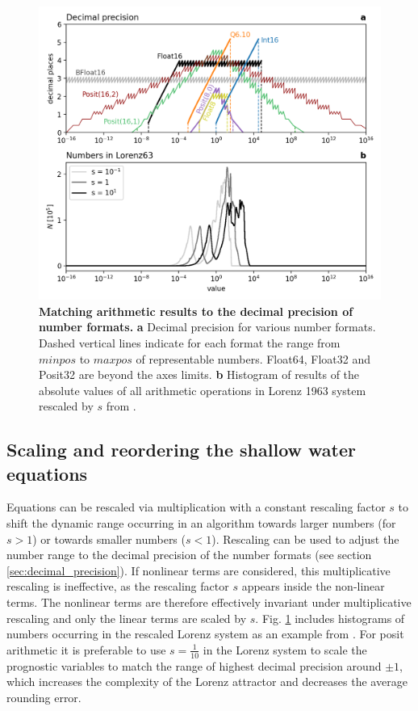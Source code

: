 \begin{figure}[htbp]
\includegraphics[width=1\textwidth]{Figures/swm/decimal_precision.png}
\caption{\textbf{Matching arithmetic results to the decimal precision of number formats.}
\textbf{a} Decimal precision for various number formats. Dashed vertical lines indicate for each format the range from $minpos$ to
$maxpos$ of representable numbers. Float64, Float32 and Posit32 are beyond the axes limits. \textbf{b} Histogram of results
of the absolute values of all arithmetic operations in Lorenz 1963 system rescaled by $s$ from \citep{Klower2019a}.}
\label{fig:swm_dec_prec}
\end{figure}

\subsection{Scaling and reordering the shallow water equations}
\label{sec:swm_scale}

Equations can be rescaled via multiplication with a constant rescaling factor $s$ to shift the dynamic range occurring in an algorithm
towards larger numbers (for $s > 1$) or towards smaller numbers ($s < 1$). Rescaling can be used to adjust the number range to the
decimal precision of the number formats (see section \ref{sec:decimal_precision}). If nonlinear terms are considered, this multiplicative
rescaling is ineffective, as the rescaling factor $s$ appears inside the non-linear terms. The nonlinear terms are therefore effectively
invariant under multiplicative rescaling and only the linear terms are scaled by $s$. Fig. \ref{fig:swm_dec_prec} includes histograms of
numbers occurring in the rescaled Lorenz system \citep{Lorenz1963,Kwasniok2014,Jeffress2017,Tantet2018} as an example
from \cite{Klower2019a}. For posit arithmetic it is preferable to use $s=\tfrac{1}{10}$ in the Lorenz system to scale the prognostic
variables to match the range of highest decimal precision around $\pm1$, which increases the complexity of the Lorenz attractor
and decreases the average rounding error.

